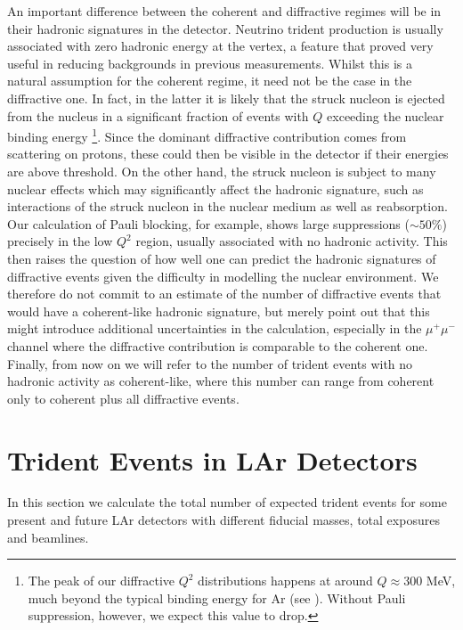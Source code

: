 An important difference between the coherent and diffractive regimes will be in their hadronic signatures in the detector. Neutrino trident production is usually associated with zero hadronic energy at the vertex, a feature that proved very useful in reducing backgrounds in previous measurements. Whilst this is a natural assumption for the coherent regime, it need not be the case in the diffractive one. In fact, in the latter it is likely that the struck nucleon is ejected from the nucleus in a significant fraction of events with $Q$ exceeding the nuclear binding energy
%
\footnote{The peak of our diffractive $Q^2$ distributions happens at around $Q \approx 300$ MeV, much beyond the typical binding energy for Ar (see ). Without Pauli suppression, however, we expect this value to drop.}. Since the dominant diffractive contribution comes from scattering on protons, these could then be visible in the detector if their energies are above threshold. On the other hand, the struck nucleon is subject to many nuclear effects which may significantly affect the hadronic signature, such as interactions of the struck nucleon in the nuclear medium as well as reabsorption. Our calculation of Pauli blocking, for example, shows large suppressions ($\sim 50\%$) precisely in the low $Q^2$ region, usually associated with no hadronic activity. This then raises the question of how well one can predict the hadronic signatures of diffractive events given the difficulty in modelling the nuclear environment. We therefore do not commit to an estimate of the number of diffractive events that would have a coherent-like hadronic signature, but merely point out that this might introduce additional uncertainties in the calculation, especially in the $\mu^+ \mu^-$ channel where the diffractive contribution is comparable to the coherent one. Finally, from now on we will refer to the number of trident events with no hadronic activity as coherent-like, where this number can range from coherent only to coherent plus all diffractive events. 


\section{Trident Events in LAr Detectors}
\label{sec:LAr}

In this section we calculate the total number of expected  trident events for some present and future LAr detectors with different fiducial masses, total exposures and beamlines.

